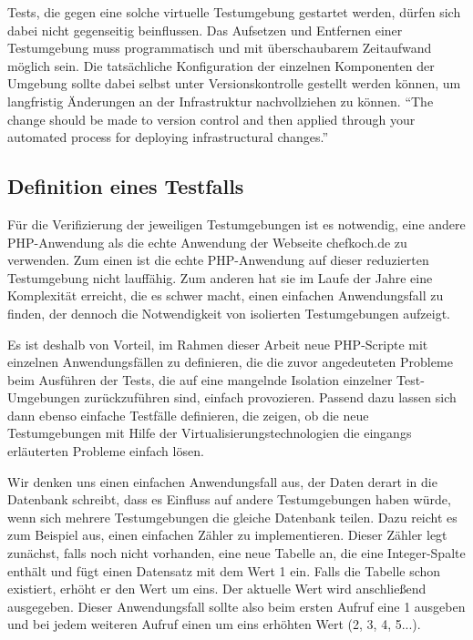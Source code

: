 Tests, die gegen eine solche virtuelle Testumgebung gestartet werden, dürfen sich dabei nicht gegenseitig beinflussen. Das Aufsetzen und Entfernen einer Testumgebung muss programmatisch und mit überschaubarem Zeitaufwand möglich sein. Die tatsächliche Konfiguration der einzelnen Komponenten der Umgebung sollte dabei selbst unter Versionskontrolle gestellt werden können, um langfristig Änderungen an der Infrastruktur nachvollziehen zu können. "`The change should be made to version control and then applied through your automated process for deploying infrastructural changes."' \citep[S.][S. 287]{HumFar10}

\subsection{Definition eines Testfalls}

Für die Verifizierung der jeweiligen Testumgebungen ist es notwendig, eine andere PHP-Anwendung als die echte Anwendung der Webseite chefkoch.de zu verwenden. Zum einen ist die echte PHP-Anwendung auf dieser reduzierten Testumgebung nicht lauffähig. Zum anderen hat sie im Laufe der Jahre eine Komplexität erreicht, die es schwer macht, einen einfachen Anwendungsfall zu finden, der dennoch die Notwendigkeit von isolierten Testumgebungen aufzeigt.

Es ist deshalb von Vorteil, im Rahmen dieser Arbeit neue PHP-Scripte mit einzelnen Anwendungsfällen zu definieren, die die zuvor angedeuteten Probleme beim Ausführen der Tests, die auf eine mangelnde Isolation einzelner Test-Umgebungen zurückzuführen sind, einfach provozieren. Passend dazu lassen sich dann ebenso einfache Testfälle definieren, die zeigen, ob die neue Testumgebungen mit Hilfe der Virtualisierungstechnologien die eingangs erläuterten Probleme einfach lösen.

Wir denken uns einen einfachen Anwendungsfall aus, der Daten derart in die Datenbank schreibt, dass es Einfluss auf andere Testumgebungen haben würde, wenn sich mehrere Testumgebungen die gleiche Datenbank teilen. Dazu reicht es zum Beispiel aus, einen einfachen Zähler zu implementieren. Dieser Zähler legt zunächst, falls noch nicht vorhanden, eine neue Tabelle an, die eine Integer-Spalte enthält und fügt einen Datensatz mit dem Wert 1 ein. Falls die Tabelle schon existiert, erhöht er den Wert um eins. Der aktuelle Wert wird anschließend ausgegeben. Dieser Anwendungsfall sollte also beim ersten Aufruf eine 1 ausgeben und bei jedem weiteren Aufruf einen um eins erhöhten Wert (2, 3, 4, 5...).

